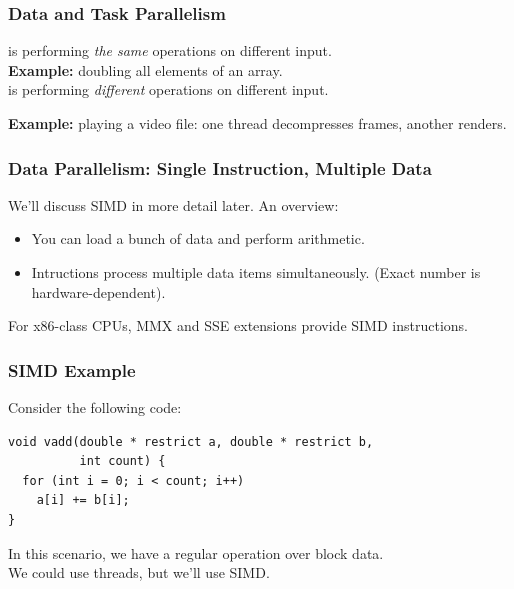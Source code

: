 \begin{frame}
  \frametitle{Data and Task Parallelism}

  
      is performing \emph{the same} operations on
      different input.\\

     {\bf Example:} doubling all elements of an array.\\[1em]

      is performing \emph{different} operations
      on different input.

    {\bf Example:} playing a video file: one thread decompresses
      frames, another renders.

  
\end{frame}

\begin{frame}
  \frametitle{Data Parallelism: Single Instruction, Multiple Data}

  
    We'll discuss SIMD in more detail later. An overview:
    \begin{itemize}
    \item You can load a bunch of data and perform 
      arithmetic.
    \item Intructions process multiple data items simultaneously.
      (Exact number is hardware-dependent).
    \end{itemize}
    For x86-class CPUs, MMX and SSE extensions provide SIMD instructions.
  
\end{frame}

\begin{frame}[fragile]
  \frametitle{SIMD Example}

  
  Consider the following code:

  \begin{lstlisting}
void vadd(double * restrict a, double * restrict b, 
          int count) {
  for (int i = 0; i < count; i++)
    a[i] += b[i];
}    
  \end{lstlisting}

    In this scenario, we have a regular operation over block data.\\[1em]

    We could use threads, but we'll use SIMD.

  
\end{frame}

